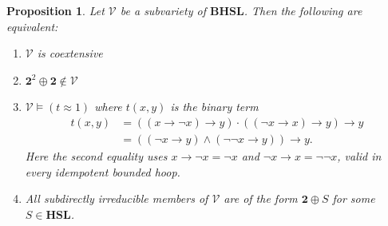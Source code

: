 \documentclass[11pt]{article}
\theoremstyle{pretty}
\newtheorem{proposition}[theorem]{Proposition}
\theoremstyle{plainnote}
\renewcommand{\2}{\mathbf{2}}
\newcommand{\V}{\mathcal{V}}
\newcommand{\HeytingSemilattices}{\mathbf{HSL}}
\newcommand{\BoundedHeytingSemilattices}{\mathbf{BHSL}}
\begin{document}
\begin{proposition}
    Let $\V$ be a subvariety of $\BoundedHeytingSemilattices$. Then the following are equivalent:
    \begin{enumerate}[label=(\roman*)]
    \item $\V$ is coextensive
    \item $\2^2 \oplus \2 \notin \V$
    \item $\V \models (t \approx 1)$ where $t(x, y)$ is the binary term 
    \begin{align*}
    t(x, y) &= ((x \to \neg x) \to y)\cdot ((\neg x \to x) \to y) \to y\\
    &= ((\neg x \to y) \wedge (\neg \neg x \to y)) \to y.
    \end{align*}
    Here the second equality uses $x\to\neg x=\neg x$ and $\neg x\to x=\neg\neg x$, valid in every idempotent bounded hoop.
    \item All subdirectly irreducible members of $\V$ are of the form $\2 \oplus S$ for some $S \in \HeytingSemilattices$.
    \end{enumerate}
\end{proposition}
\end{document}

